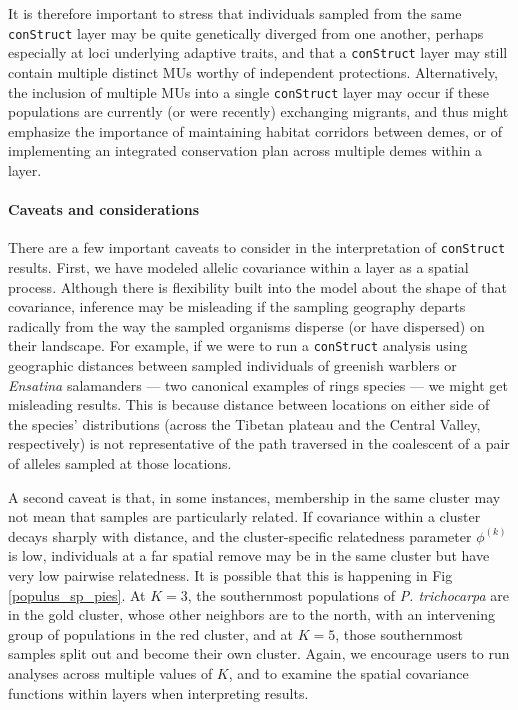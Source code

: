 \documentclass[12pt]{article}
\begin{document}
It is therefore important to stress that individuals sampled from the same \texttt{conStruct} layer 
may be quite genetically diverged from one another, 
perhaps especially at loci underlying adaptive traits, 
and that a \texttt{conStruct} layer may still contain multiple distinct MUs worthy of independent protections.  
Alternatively, the inclusion of multiple MUs into a single \texttt{conStruct} layer 
may occur if these populations are currently 
(or were recently) exchanging migrants, 
and thus might emphasize the importance of maintaining habitat corridors between demes, 
or of implementing an integrated conservation plan across multiple demes within a layer.

\paragraph{Caveats and considerations}
There are a few important caveats to consider in the interpretation of \texttt{conStruct} results. 
First, we have modeled allelic covariance within a layer as a spatial process.
Although there is flexibility built into the model about the shape of that covariance, 
inference may be misleading if the sampling geography departs radically from the way 
the sampled organisms disperse (or have dispersed) on their landscape.
For example, if we were to run a \texttt{conStruct} analysis using geographic distances between 
sampled individuals of greenish warblers \citep{Irwin2001} or \textit{Ensatina} salamanders \citep{wake_schneider1998} 
--- two canonical examples of rings species --- 
we might get misleading results.
This is because distance between locations on either side of the species' distributions
(across the Tibetan plateau and the Central Valley, respectively) 
is not representative of the path traversed in the coalescent of a pair of alleles sampled at those locations.

A second caveat is that, in some instances, 
membership in the same cluster may not mean that samples are particularly related.
If covariance within a cluster decays sharply with distance, 
and the cluster-specific relatedness parameter $\phi^{(k)}$ is low, 
individuals at a far spatial remove may be in the same cluster but have very low pairwise relatedness.
It is possible that this is happening in Fig \ref{populus_sp_pies}. 
At $K=3$, the southernmost populations of \textit{P. trichocarpa} are in the gold cluster, 
whose other neighbors are to the north, with an intervening group of populations in the red cluster, 
and at $K=5$, those southernmost samples split out and become their own cluster.
Again, we encourage users to run analyses across multiple values of $K$, 
and to examine the spatial covariance functions within layers when interpreting results.
\end{document}
